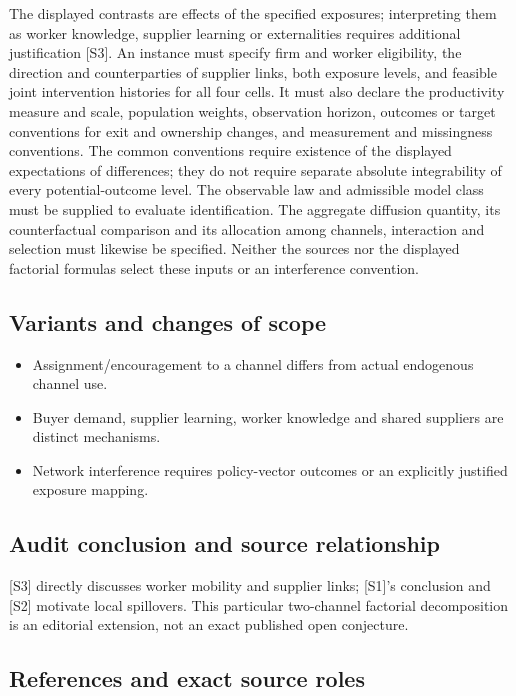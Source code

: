 \documentclass[11pt,a4paper]{article}
\begin{document}
The displayed contrasts are effects of the specified exposures; interpreting them as worker knowledge, supplier learning or externalities requires additional justification [S3]. An instance must specify firm and worker eligibility, the direction and counterparties of supplier links, both exposure levels, and feasible joint intervention histories for all four cells. It must also declare the productivity measure and scale, population weights, observation horizon, outcomes or target conventions for exit and ownership changes, and measurement and missingness conventions. The common conventions require existence of the displayed expectations of differences; they do not require separate absolute integrability of every potential-outcome level. The observable law and admissible model class must be supplied to evaluate identification. The aggregate diffusion quantity, its counterfactual comparison and its allocation among channels, interaction and selection must likewise be specified. Neither the sources nor the displayed factorial formulas select these inputs or an interference convention.

\subsection*{Variants and changes of scope}

\begin{itemize}
\item Assignment/encouragement to a channel differs from actual endogenous channel use.
\item Buyer demand, supplier learning, worker knowledge and shared suppliers are distinct mechanisms.
\item Network interference requires policy-vector outcomes or an explicitly justified exposure mapping.
\end{itemize}

\subsection*{Audit conclusion and source relationship}

[S3] directly discusses worker mobility and supplier links; [S1]'s conclusion and [S2] motivate local spillovers. This particular two-channel factorial decomposition is an editorial extension, not an exact published open conjecture.

\subsection*{References and exact source roles}
\end{document}
